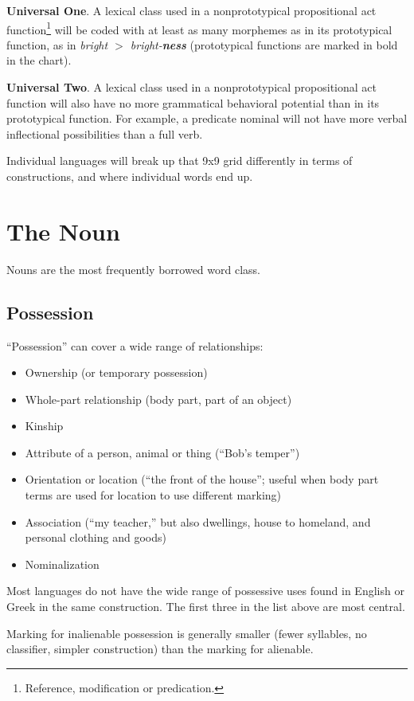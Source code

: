 \documentclass[11pt]{article}
\newcommand{\LL}[1]{\textbf{#1}}  %
\newenvironment{grammarlist}%
 {\begin{itemize}\addtolength{\itemsep}{-0.5\baselineskip}\ignorespaces}%
 {\end{itemize}\ignorespacesafterend}
\begin{document}
\LL{Universal One}. A lexical class used in a nonprototypical
propositional act function\footnote{Reference, modification or
predication.} will be coded with at least as many morphemes as in
its prototypical function, as in \textit{bright $>$ bright-\LL{ness}}
(prototypical functions are marked in bold in the chart).

\LL{Universal Two}. A lexical class used in a nonprototypical
propositional act function will also have no more grammatical
behavioral potential than in its prototypical function. For example, a
predicate nominal will not have more verbal inflectional possibilities
than a full verb.

Individual languages will break up that 9x9 grid differently in terms
of constructions, and where individual words end up.


\section{The Noun}
Nouns are the most frequently borrowed word class.

\subsection{Possession}
``Possession'' can cover a wide range of relationships:

\begin{grammarlist}
  \item Ownership (or temporary possession)
  \item Whole-part relationship (body part, part of an object)
  \item Kinship
  \item Attribute of a person, animal or thing (``Bob's temper'')
  \item Orientation or location (``the front of the house''; useful
    when body part terms are used for location to use different
    marking)
  \item Association (``my teacher,'' but also dwellings, house to
    homeland, and personal clothing and goods)
  \item Nominalization
\end{grammarlist}

\noindent Most languages do not have the wide range of possessive uses
found in English or Greek in the same construction.  The first three
in the list above are most central.

Marking for inalienable possession is generally smaller (fewer
syllables, no classifier, simpler construction) than the marking for
alienable.
\end{document}
